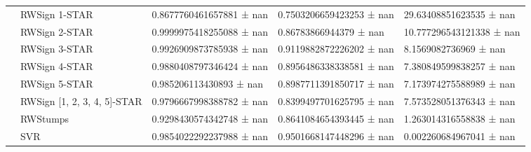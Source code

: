 \begin{tabular}{lllll}
 & RWSign 1-STAR & 0.8677760461657881 ± nan & 0.7503206659423253 ± nan & 29.63408851623535 ± nan \\
 & RWSign 2-STAR & 0.9999975418255088 ± nan & 0.86783866944379 ± nan & 10.777296543121338 ± nan \\
 & RWSign 3-STAR & 0.9926909873785938 ± nan & 0.9119882872226202 ± nan & 8.1569082736969 ± nan \\
 & RWSign 4-STAR & 0.9880408797346424 ± nan & 0.8956486338338581 ± nan & 7.380849599838257 ± nan \\
 & RWSign 5-STAR & 0.985206113430893 ± nan & 0.8987711391850717 ± nan & 7.173974275588989 ± nan \\
 & RWSign [1, 2, 3, 4, 5]-STAR & 0.9796667998388782 ± nan & 0.8399497701625795 ± nan & 7.573528051376343 ± nan \\
 & RWStumps & 0.9298430574342748 ± nan & 0.8641084654393445 ± nan & 1.263014316558838 ± nan \\
 & SVR & 0.9854022292237988 ± nan & 0.9501668147448296 ± nan & 0.002260684967041 ± nan \\
\cline{1-5}
\bottomrule
\end{tabular}
